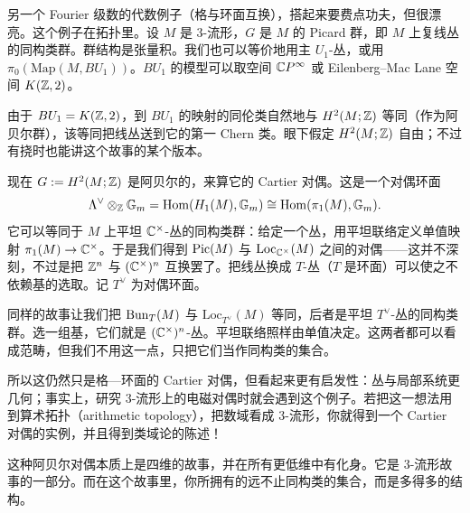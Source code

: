 
\begin{example}
  另一个 Fourier 级数的代数例子（格与环面互换），搭起来要费点功夫，但很漂亮。这个例子在拓扑里。设 $M$ 是 $3$-流形，$G$ 是 $M$ 的 Picard 群，即 $M$ 上复线丛的同构类群。群结构是张量积。我们也可以等价地用主 $U_1$-丛，或用 $\pi_0(\mathrm{Map}(M,BU_1))$。$BU_1$ 的模型可以取空间 $\mathbb{C} P^\infty$ 或 Eilenberg--Mac Lane 空间 $K(\mathbb{Z},2)$。

  由于 $BU_1 = K(\mathbb{Z},2)$，到 $BU_1$ 的映射的同伦类自然地与 $H^2(M;\mathbb{Z})$ 等同（作为阿贝尔群），该等同把线丛送到它的第一 Chern 类。眼下假定 $H^2(M;\mathbb{Z})$ 自由；不过有挠时也能讲这个故事的某个版本。

  现在 $G := H^2(M;\mathbb{Z})$ 是阿贝尔的，来算它的 Cartier 对偶。这是一个对偶环面
  \[
    \Lambda^\vee\otimes_{\mathbb{Z}} \mathbb{G}_m = \operatorname{Hom}(H_1(M),\mathbb{G}_m)\cong \operatorname{Hom}(\pi_1(M),\mathbb{G}_m).
  \]
  它可以等同于 $M$ 上平坦 $\mathbb{C}^\times$-丛的同构类群：给定一个丛，用平坦联络定义单值映射 $\pi_1(M)\to\mathbb{C}^\times$。于是我们得到 $\operatorname{Pic}(M)$ 与 $\mathrm{Loc}_{\mathbb{C}^\times}(M)$ 之间的对偶——这并不深刻，不过是把 $\mathbb{Z}^n$ 与 $(\mathbb{C}^\times)^n$ 互换罢了。把线丛换成 $T$-丛（$T$ 是环面）可以使之不依赖基的选取。记 $T^\vee$ 为对偶环面。

  同样的故事让我们把 $\mathrm{Bun}_T(M)$ 与 $\mathrm{Loc}_{T^\vee}(M)$ 等同，后者是平坦 $T^\vee$-丛的同构类群。选一组基，它们就是 $(\mathbb{C}^\times)^n$-丛。平坦联络照样由单值决定。这两者都可以看成范畴，但我们不用这一点，只把它们当作同构类的集合。

  所以这仍然只是格—环面的 Cartier 对偶，但看起来更有启发性：丛与局部系统更几何；事实上，研究 $3$-流形上的电磁对偶时就会遇到这个例子。若把这一想法用到算术拓扑（arithmetic topology），把数域看成 $3$-流形，你就得到一个 Cartier 对偶的实例，并且得到类域论的陈述！
\end{example}

这种阿贝尔对偶本质上是四维的故事，并在所有更低维中有化身。它是 $3$-流形故事的一部分。而在这个故事里，你所拥有的远不止同构类的集合，而是多得多的结构。
